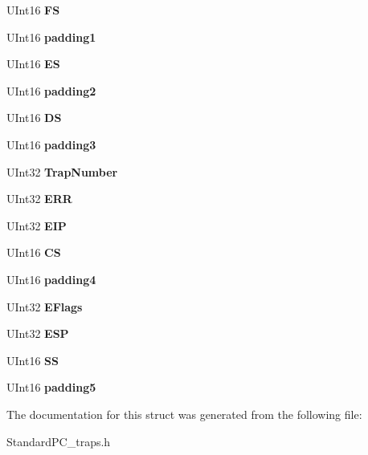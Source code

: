 \begin{DoxyCompactItemize}
\item 
\mbox{\label{struct_trap_frame_a722b07ac072e28ddb8fbf3c02d2b5cf5}} 
U\+Int16 {\bfseries FS}
\item 
\mbox{\label{struct_trap_frame_a2f028029eccae5ce88c9c6763817a215}} 
U\+Int16 {\bfseries padding1}
\item 
\mbox{\label{struct_trap_frame_a9cba0706a88b333f064d8723d3000fe6}} 
U\+Int16 {\bfseries ES}
\item 
\mbox{\label{struct_trap_frame_aa8d3acd04601f4efa50aa3c39c220583}} 
U\+Int16 {\bfseries padding2}
\item 
\mbox{\label{struct_trap_frame_ad9b6efdd701fcb852eeecec5e995e2f4}} 
U\+Int16 {\bfseries DS}
\item 
\mbox{\label{struct_trap_frame_abe34626c13ad0d26ecaab89b99f86456}} 
U\+Int16 {\bfseries padding3}
\item 
\mbox{\label{struct_trap_frame_ac02164c0fef333a9133a73c780b90969}} 
U\+Int32 {\bfseries Trap\+Number}
\item 
\mbox{\label{struct_trap_frame_a422019af2485db357d3630a6c4dd4870}} 
U\+Int32 {\bfseries E\+RR}
\item 
\mbox{\label{struct_trap_frame_a9d86ca85e646f0a8ee983ec41fef24c0}} 
U\+Int32 {\bfseries E\+IP}
\item 
\mbox{\label{struct_trap_frame_a736cf70dcdb8df49dd432611a0311417}} 
U\+Int16 {\bfseries CS}
\item 
\mbox{\label{struct_trap_frame_a84c399856429535aab7b53af0330d154}} 
U\+Int16 {\bfseries padding4}
\item 
\mbox{\label{struct_trap_frame_a770cca21fc5d6345f87a8cd335e7955d}} 
U\+Int32 {\bfseries E\+Flags}
\item 
\mbox{\label{struct_trap_frame_ae7da4a223b7647cec98253a708058808}} 
U\+Int32 {\bfseries E\+SP}
\item 
\mbox{\label{struct_trap_frame_a819b288da6ad2d4485c0ea1b3f57b2da}} 
U\+Int16 {\bfseries SS}
\item 
\mbox{\label{struct_trap_frame_aa1bac62bb9daebb9ac70dbbb7169c782}} 
U\+Int16 {\bfseries padding5}
\end{DoxyCompactItemize}


The documentation for this struct was generated from the following file\+:\begin{DoxyCompactItemize}
\item 
Standard\+P\+C\+\_\+traps.\+h\end{DoxyCompactItemize}
